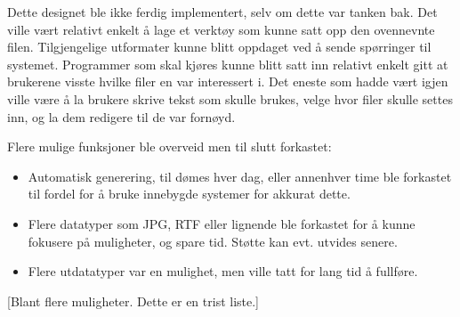 \documentclass[11pt]{article}
\begin{document}
Dette designet ble ikke ferdig implementert, selv om dette var tanken bak. Det ville vært relativt enkelt å lage et verktøy som kunne satt opp den ovennevnte filen. Tilgjengelige utformater kunne blitt oppdaget ved å sende spørringer til systemet. Programmer som skal kjøres kunne blitt satt inn relativt enkelt gitt at brukerene visste hvilke filer en var interessert i. Det eneste som hadde vært igjen ville være å la brukere skrive tekst som skulle brukes, velge hvor filer skulle settes inn, og la dem redigere til de var fornøyd.



Flere mulige funksjoner ble overveid men til slutt forkastet:




\begin{itemize}
\item Automatisk generering, til dømes hver dag, eller annenhver time ble forkastet til fordel for å bruke innebygde systemer for akkurat dette.
\item Flere datatyper som JPG, RTF eller lignende ble forkastet for å kunne fokusere på muligheter, og spare tid. Støtte kan evt. utvides senere.
\item Flere utdatatyper var en mulighet, men ville tatt for lang tid å fullføre.
\end{itemize}




[Blant flere muligheter. Dette er en trist liste.]
\end{document}
